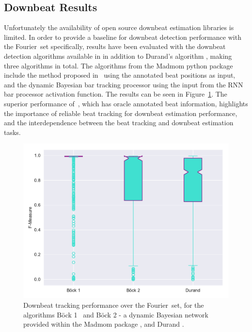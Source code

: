\documentclass{article}
\newcommand{\setName}{Fourier}
\begin{document}
\subsection{Downbeat Results}

Unfortunately the availability of open source downbeat estimation libraries is limited. In order to provide a baseline for downbeat detection performance
with the \setName~set specifically, results have been evaluated with the downbeat detection algorithms available in \cite{Bock2016b} in addition to Durand's algorithm \cite{Durand2016}, making three algorithms in total.
The algorithms from the Madmom python package \cite{Bock2016b} include the method proposed in~\cite{Bock2016} using the annotated beat positions as input, and the dynamic Bayesian bar tracking processor using the input from the RNN bar processor activation
function. The results can be seen in Figure~\ref{fig:downbeat_results}. The superior performance of~\cite{Bock2016}, which has oracle annotated beat information, highlights the importance
of reliable beat tracking for downbeat estimation performance, and the interdependence between the beat tracking and downbeat estimation tasks.

\begin{figure}
    \centerline{\includegraphics[width=\columnwidth]{figs/2019_04_09_10_27_35_Downbeat_Re_F-Measure.pdf}}
    \caption{Downbeat tracking performance over the \setName~set, for the algorithms B{\"o}ck 1~\cite{Bock2016} and B{\"o}ck 2 - a dynamic Bayesian network provided within the Madmom package \cite{Bock2016b}, and Durand \cite{Durand2016}.}
    \label{fig:downbeat_results}
\end{figure}
\end{document}
